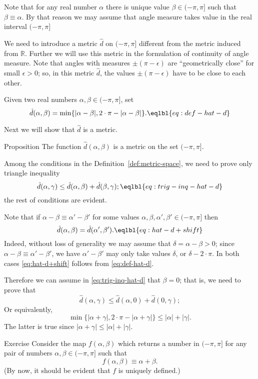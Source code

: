 {Note that for any real number $\alpha$ there is unique value $\beta\in(-\pi,\pi]$ such that
$\beta\equiv \alpha$.
By that reason we may assume that angle measure takes value in the real interval $(-\pi,\pi]$

We need to introduce a metric $\hat{d}$ on $(-\pi,\pi]$
different from the metric induced from $\mathbb{R}$.
Further we will use this metric in the formulation 
of continuity of angle measure.
Note that angles with measures $\pm(\pi-\epsilon)$ are ``geometrically close'' for small $\epsilon>0$;
so, in this metric $\hat{d}$, the values $\pm(\pi-\epsilon)$ have to be close to each other.

Given two real numbers 
$\alpha,\beta\in (-\pi,\pi]$,
set \label{def:max-dist}
$$\hat{d}(\alpha,\beta)
=
\min\{|\alpha-\beta|,2\cdot\pi-|\alpha-\beta|\}.
\eqlbl{eq:def-hat-d}
$$

Next we will show that $\hat{d}$ is a metric.

\begin{thm}{Proposition}
The function $\hat{d}(\alpha,\beta)$ is a metric on the set $(-\pi,\pi]$.
\end{thm}

Among the conditions in the Definition~\ref{def:metric-space}, we need to prove only triangle inequality
$$\hat{d}(\alpha,\gamma)\le \hat{d}(\alpha,\beta)+\hat{d}(\beta,\gamma);
\eqlbl{eq:trig-inq-hat-d}$$
the rest of conditions are  evident.

Note that if $\alpha-\beta\equiv \alpha'-\beta'$
for some values 
$\alpha,\beta,\alpha',\beta'\in (-\pi,\pi]$
then 
$$\hat{d}(\alpha,\beta)
=
\hat{d}(\alpha',\beta').
\eqlbl{eq:hat-d+shift}$$
Indeed, without loss of generality we may assume that $\delta=\alpha-\beta>0$;
since $\alpha-\beta\equiv \alpha'-\beta'$,
we have $\alpha'-\beta'$ may only take  values $\delta$, or $\delta-2\cdot\pi $.
In both cases \ref{eq:hat-d+shift} follows from \ref{eq:def-hat-d}.

Therefore we can assume in \ref{eq:trig-inq-hat-d}
that $\beta=0$;
that is, we need to prove that
$$\hat{d}(\alpha,\gamma)
\le 
\hat{d}(\alpha,0)+\hat{d}(0,\gamma);
$$
Or equivalently,
$$\min\{|\alpha+\gamma|,2\cdot\pi-|\alpha+\gamma|\}\le |\alpha|+|\gamma|.$$
The latter is true since 
$|\alpha+\gamma|\le |\alpha|+|\gamma|$.
\qeds

\begin{thm}{Exercise}\label{ex:hat-d-and-+}
Consider the map 
$f(\alpha,\beta)$ which returns a number in $(-\pi,\pi]$ for any pair of numbers $\alpha,\beta\in (-\pi,\pi]$
such that 
$$f(\alpha,\beta)\equiv \alpha+\beta.$$
(By now, it should be evident that $f$ is uniquely defined.)


\end{thm}}
